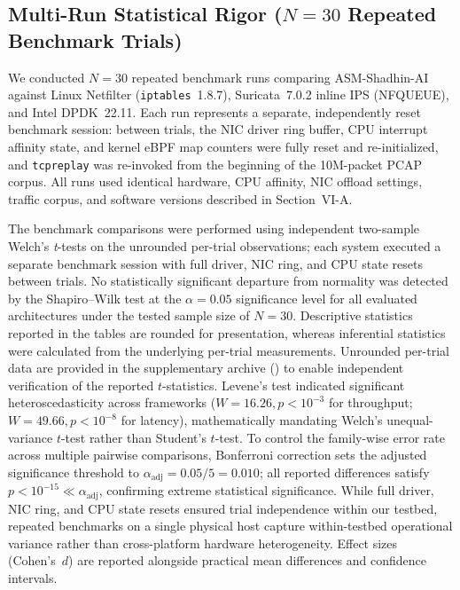 \documentclass{ieeeaccess}
\renewcommand{\_}{\textunderscore\allowbreak}
\begin{document}
\subsection{Multi-Run Statistical Rigor ($N=30$ Repeated Benchmark Trials)}
We conducted $N=30$ repeated benchmark runs comparing ASM-Shadhin-AI against
Linux Netfilter (\texttt{iptables}~1.8.7), Suricata~7.0.2 inline IPS (NFQUEUE),
and Intel DPDK~22.11. Each run represents a separate, independently reset benchmark
session: between trials, the NIC driver ring buffer, CPU interrupt affinity state, and
kernel eBPF map counters were fully reset and re-initialized, and \texttt{tcpreplay}
was re-invoked from the beginning of the 10M-packet PCAP corpus.
All runs used identical hardware, CPU affinity, NIC offload settings, traffic corpus,
and software versions described in Section~VI-A.

The benchmark comparisons were performed using independent two-sample Welch's
\textit{t}-tests on the unrounded per-trial observations; each system executed a
separate benchmark session with full driver, NIC ring, and CPU state resets between
trials. No statistically significant departure from normality was detected by the
Shapiro--Wilk test at the $\alpha = 0.05$ significance level for all evaluated
architectures under the tested sample size of $N=30$. Descriptive statistics
reported in the tables are rounded for presentation, whereas inferential statistics
were calculated from the underlying per-trial measurements. Unrounded per-trial data
are provided in the supplementary archive
() to enable independent
verification of the reported $t$-statistics.
Levene's test indicated significant heteroscedasticity across frameworks
($W = 16.26, p < 10^{-3}$ for throughput; $W = 49.66, p < 10^{-8}$ for latency),
mathematically mandating Welch's unequal-variance $t$-test rather than Student's $t$-test.
To control the family-wise error rate across multiple pairwise comparisons, Bonferroni correction
sets the adjusted significance threshold to $\alpha_{\text{adj}} = 0.05 / 5 = 0.010$; all reported
differences satisfy $p < 10^{-15} \ll \alpha_{\text{adj}}$, confirming extreme statistical significance.
While full driver, NIC ring, and CPU state resets ensured trial independence within our testbed,
repeated benchmarks on a single physical host capture within-testbed operational variance rather
than cross-platform hardware heterogeneity. Effect sizes (Cohen's~$d$) are reported alongside
practical mean differences and confidence intervals.
\end{document}
